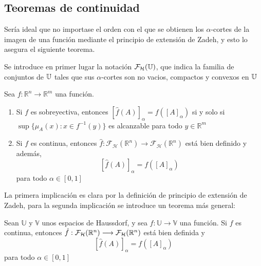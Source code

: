   \subsection{Teoremas de continuidad}
  Sería ideal que no importase el orden con el que se obtienen los $\alpha$-cortes de la imagen de una función mediante el principio de extensión de Zadeh, y esto lo asegura el siguiente teorema.

  Se introduce en primer lugar la notación $\mathcal{F}_\mathcal{H}(\mathbb U)$, que indica la familia de conjuntos de $\mathbb U$ tales que sus $\alpha$-cortes son no vacios, compactos y convexos en $\mathbb U$
  \begin{teorema}
  	\label{teorema:contfuzzy}
    Sea $f : \mathbb{R}^n \longrightarrow \mathbb{R}^m$ una función.
    \begin{enumerate}
    \item Si $f$ es sobreyectiva, entonces $[\hat{f}(A)]_\alpha = f([A]_\alpha)$ si y solo si $\sup\{\mu_A(x) : x \in f^{-1}(y)\}$ es alcanzable para todo $y \in \mathbb{R}^m$
    \item Si $f$ es continua, entonces $\hat{f} : \mathcal{F}_\mathcal{H}(\mathbb{R}^n) \longrightarrow \mathcal{F}_\mathcal{H}(\mathbb{R}^n)$ está bien definido y además,  
      $$[\hat{f}(A)]_\alpha = f([A]_\alpha)$$
      para todo $\alpha \in [0, 1]$
    \end{enumerate}
  \end{teorema}

  La primera implicación es clara por la definición de principio de extensión de Zadeh, para la segunda implicación se introduce un teorema más general:


  \begin{teorema}
    Sean $\mathbb{U}$ y $\mathbb{V}$ unos espacios de Haussdorf, y sea $f: \mathbb{U} \longrightarrow \mathbb{V}$ una función. Si $f$ es continua, entonces  $\hat{f} : \mathcal{F}_\mathcal{H}(\mathbb R^n) \longrightarrow \mathcal{F}_\mathcal{H}(\mathbb R^n)$ está bien definida y $$[\hat{f}(A)]_\alpha = f([A]_\alpha)$$
    para todo $\alpha \in [0, 1]$
  \end{teorema}

